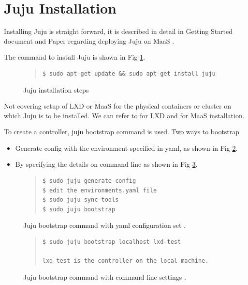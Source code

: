 \documentclass[9pt,twocolumn,twoside]{../../styles/osajnl}
\begin{document}
\section{Juju Installation}
Installing Juju is straight forward, it is described in detail in
Getting Started document \cite{www-jujucharm-documentation} and Paper
regarding deploying Juju on MaaS \cite{juju-paper}.

The command to install Juju is shown in Fig \ref{fig:juju-install}.
\begin{figure}
  \centering
  \caption{Juju installation steps\cite{www-juju}}\label{fig:juju-install}
  \begin{quote}
    \begin{Verbatim}
$ sudo apt-get update && sudo apt-get install juju
    \end{Verbatim}
  \end{quote}
\end{figure}

Not covering setup of LXD or MaaS for the physical containers or
cluster on which Juju is to be installed. We can refer to
\cite{www-jujucharm-documentation} for LXD and \cite{juju-paper} for
MaaS installation.

To create a controller, juju bootstrap command is used. Two ways to bootstrap
\begin{itemize}
  \item[1.] Generate config with the environment specified in yaml, as
    shown in Fig \ref{fig:bootstrap}.
  \item[2.] By specifying the details on command line as shown in Fig
    \ref{fig:bootstrapcmd}.
\end{itemize}

\begin{figure}
  \centering
  \caption{Juju bootstrap command with yaml configuration set \cite{www-juju}.}
  \label{fig:bootstrap}
  \begin{quote}
    \begin{Verbatim}
$ sudo juju generate-config
$ edit the environments.yaml file
$ sudo juju sync-tools
$ sudo juju bootstrap
    \end{Verbatim}
  \end{quote}
\end{figure}

\begin{figure}
  \caption{Juju bootstrap command with command line settings \cite{www-juju}.}
  \label{fig:bootstrapcmd}
  \begin{quote}
    \begin{Verbatim}
$ sudo juju bootstrap localhost lxd-test

lxd-test is the controller on the local machine.
    \end{Verbatim}
  \end{quote}
\end{figure}
\end{document}
